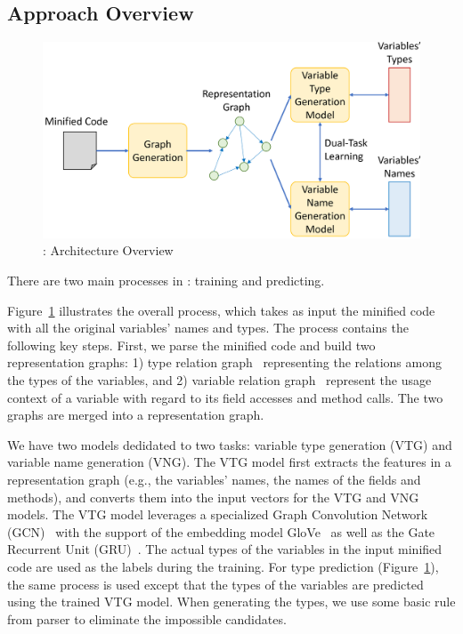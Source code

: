 \subsection{Approach Overview}


\begin{figure}[t]
	\begin{center}
	  \includegraphics[width=\columnwidth]{figures/overview.png}
          \vspace{-15pt}
		\caption{{\tool}: Architecture Overview}
		\label{overview}
	\end{center}
\end{figure}


There are two main processes in {\tool}: training and predicting.

Figure~\ref{overview} illustrates the overall process, which takes as
input the minified code with all the original variables' names and
types. The process contains the following key steps. First, we parse
the minified code and build two representation graphs: 1) type
relation graph~\cite{} representing the relations among the types of
the variables, and 2) variable relation graph~\cite{icse19} represent
the usage context of a variable with regard to its field accesses and
method calls. The two graphs are merged into a representation graph.

We have two models dedidated to two tasks: variable type generation
(VTG) and variable name generation (VNG). The VTG model first extracts
the features in a representation graph (e.g., the variables' names,
the names of the fields and methods), and converts them into the input
vectors for the VTG and VNG models. The VTG model leverages a
specialized Graph Convolution Network (GCN)~\cite{} with the support
of the embedding model GloVe~\cite{} as well as the Gate Recurrent
Unit (GRU)~\cite{}. The actual types of the variables in the input
minified code are used as the labels during the training. For type
prediction (Figure~\ref{overview}), the same process is used
except that the types of the variables are predicted using the trained
VTG model. When generating the types, we use some basic rule from
parser to eliminate the impossible candidates.

